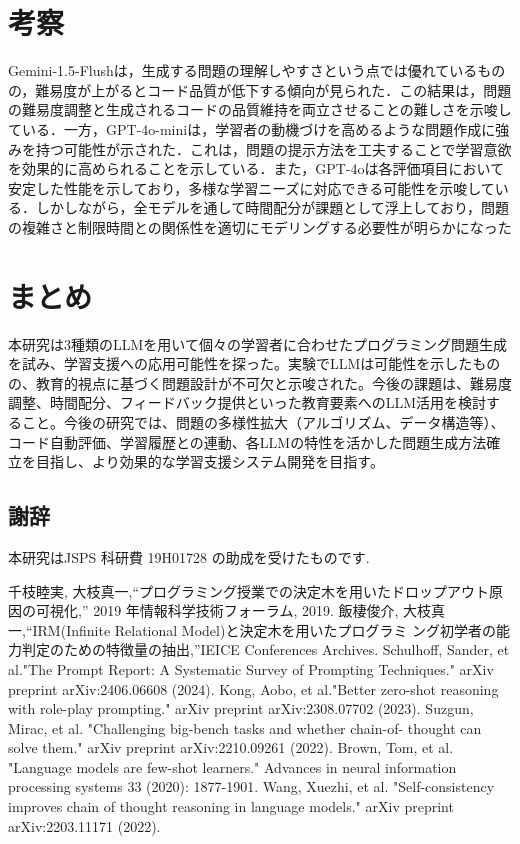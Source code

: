 \documentclass[twocolumn, fleqn, uplatex]{jsarticle}
\begin{document}
\section{考察}
Gemini-1.5-Flushは，生成する問題の理解しやすさという点では優れているものの，難易度が上がるとコード品質が低下する傾向が見られた．この結果は，問題の難易度調整と生成されるコードの品質維持を両立させることの難しさを示唆している．一方，GPT-4o-miniは，学習者の動機づけを高めるような問題作成に強みを持つ可能性が示された．これは，問題の提示方法を工夫することで学習意欲を効果的に高められることを示している．また，GPT-4oは各評価項目において安定した性能を示しており，多様な学習ニーズに対応できる可能性を示唆している．しかしながら，全モデルを通して時間配分が課題として浮上しており，問題の複雑さと制限時間との関係性を適切にモデリングする必要性が明らかになった

\section{まとめ}
本研究は3種類のLLMを用いて個々の学習者に合わせたプログラミング問題生成を試み、学習支援への応用可能性を探った。実験でLLMは可能性を示したものの、教育的視点に基づく問題設計が不可欠と示唆された。今後の課題は、難易度調整、時間配分、フィードバック提供といった教育要素へのLLM活用を検討すること。今後の研究では、問題の多様性拡大（アルゴリズム、データ構造等）、コード自動評価、学習履歴との連動、各LLMの特性を活かした問題生成方法確立を目指し、より効果的な学習支援システム開発を目指す。

\subsection*{謝辞}
本研究はJSPS 科研費 19H01728 の助成を受けたものです.

\begin{thebibliography}{9}
  \renewcommand{\baselinestretch}{1.0}
  千枝睦実, 大枝真一,“プログラミング授業での決定木を用いたドロップアウト原因の可視化,” 2019 年情報科学技術フォーラム, 2019.
  飯棲俊介, 大枝真一,“IRM(Infinite Relational Model)と決定木を用いたプログラミ ング初学者の能力判定のための特徴量の抽出,”IEICE Conferences Archives.
  Schulhoff, Sander, et al."The Prompt Report: A Systematic Survey of Prompting Techniques." arXiv preprint arXiv:2406.06608 (2024).
  Kong, Aobo, et al."Better zero-shot reasoning with role-play prompting." arXiv preprint arXiv:2308.07702 (2023).
  Suzgun, Mirac, et al. "Challenging big-bench tasks and whether chain-of- thought can solve them." arXiv preprint arXiv:2210.09261 (2022).
  Brown, Tom, et al. "Language models are few-shot learners." Advances in neural information processing systems 33 (2020): 1877-1901.
   Wang, Xuezhi, et al. "Self-consistency improves chain of thought reasoning in language models." arXiv preprint arXiv:2203.11171 (2022).

  
\end{thebibliography}
\end{document}
